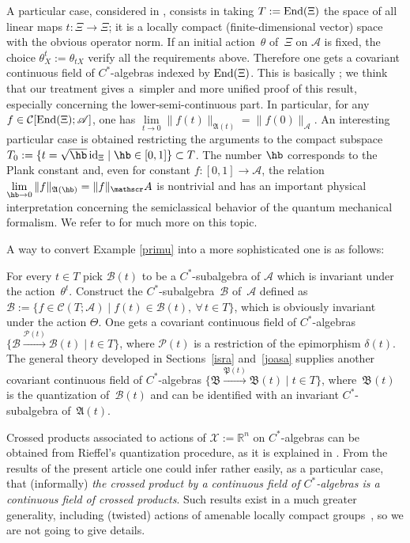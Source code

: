 \documentclass[pdftex]{sigma}
\def\A{{\mathcal A}}
\def\th{\theta}
\def\Th{\Theta}
\def\X{\mathscr X}
\def\AA{\mathfrak A}
\def\C{\mathcal{C}}
\def\B{{\mathcal B}}
\def\P{\mathcal P}
\def\BB{\mathfrak B}
\def\PP{{\mathfrak P}}
\begin{document}
\begin{Example}\label{secundu}
A particular case, considered in \cite[Chapter~8]{Rie1}, consists in taking $T:={\rm End}(\Xi)$ the space of all linear maps
$t:\Xi\rightarrow\Xi$; it is a locally compact (f\/inite-dimensional vector) space with the obvious operator norm.
If an initial action~$\theta$ of~$\Xi$ on $\mathscr A$ is f\/ixed, the choice $\theta^t_X:=\theta_{tX}$ verify all
the requirements above. Therefore one gets a covariant continuous f\/ield of $C^*$-algebras indexed by ${\rm End}(\Xi)$.
This is basically \cite[Theorem~8.3]{Rie1}; we think that our treatment gives a~simpler and more unif\/ied proof of this result,
especially concerning the lower-semi-continuous part.
In particular, for any $f\in\C[{\rm End}(\Xi);\mathscr A]$, one has
$\lim\limits_{t\rightarrow 0}\| f(t)\|_{\AA(t)}=\| f(0)\|_\mathscr A$.
An interesting particular case is obtained restricting the arguments to the compact subspace
$T_0:=\{t=\sqrt\hb\, {\rm id}_\Xi\mid \hb\in[0,1]\}\subset T$. The number $\hb$ corresponds to the Plank constant and, even for
constant $f:[0,1]\rightarrow\mathscr A$, the relation
$\lim\limits_{\hb\rightarrow 0} \| f\|_{\AA(\hb)}=\| f\|_\mathscr A$
is nontrivial and has an important physical
interpretation concerning the semiclassical behavior of the quantum mechanical formalism. We refer to \cite{La,Rie1,Rie2} for
much more on this topic.
\end{Example}

\begin{Remark}\label{subsumat}
A way to convert Example \ref{primu} into a more sophisticated one is as follows:

For every $t\in T$ pick $\B(t)$ to be a $C^*$-subalgebra
of $\mathscr A$ which is invariant under the action~$\th^t$. Construct the $C^*$-subalgebra~$\B$ of~$\A$ def\/ined as
$\B:=\{f\in\C(T;\mathscr A)\mid f(t)\in\B(t),\ \forall\,t\in T\}$,
which is obviously invariant under the action $\Th$. One gets a covariant continuous f\/ield of $C^*$-algebras
$\big\{\B\overset{\P(t)}{\longrightarrow}\B(t)\mid t\in T\big\}$, where $\P(t)$ is a restriction of the
epimorphism $\delta(t)$. The general theory developed in Sections~\ref{isra} and~\ref{joasa}
supplies another covariant continuous f\/ield of $C^*$-algebras
$\big\{\BB\overset{\PP(t)}{\longrightarrow}\BB(t)\mid t\in T\big\}$, where~$\BB(t)$ is the quantization of~$\B(t)$
and can be identif\/ied with an invariant $C^*$-subalgebra of~$\AA(t)$.
\end{Remark}

\begin{Example}\label{hartog}
Crossed products associated to actions of $\X:=\mathbb R^n$ on $C^*$-algebras can be obtained from Rief\/fel's
quantization procedure, as it is explained in \cite[Example~10.5]{Rie1}. From the results of the present article one could
infer rather easily, as a particular case, that (informally) {\it the crossed product by a continuous field of
$C^*$-algebras is a continuous field of crossed products}. Such results exist in a much greater generality, including
(twisted) actions of amenable locally compact groups~\cite{Ni,PR,Rie,Wi}, so we are not going to give details.
\end{Example}
\end{document}
